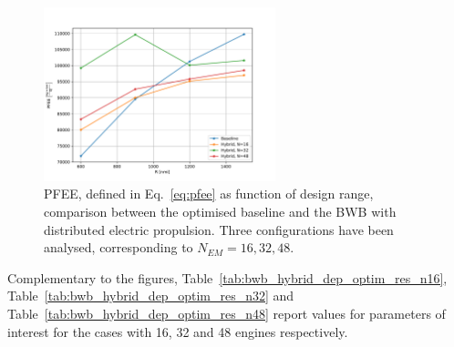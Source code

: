 \begin{figure}[!h]
	\centering
	\includegraphics[keepaspectratio, width=0.6\textwidth]{images/chap4/bwb_hybrid_dep_optim_pfee_comp}
	\caption{PFEE, defined in Eq.~\eqref{eq:pfee} as function of design range, comparison between the optimised baseline and the BWB with distributed electric propulsion. Three configurations have been analysed, corresponding to $N_{EM}=16,32,48$.}
	\label{fig:bwb_hybrid_dep_optim_pfee_comp}
\end{figure}
Complementary to the figures, Table~\ref{tab:bwb_hybrid_dep_optim_res_n16}, Table~\ref{tab:bwb_hybrid_dep_optim_res_n32} and Table~\ref{tab:bwb_hybrid_dep_optim_res_n48} report values for parameters of interest for the cases with 16, 32 and 48 engines respectively.
